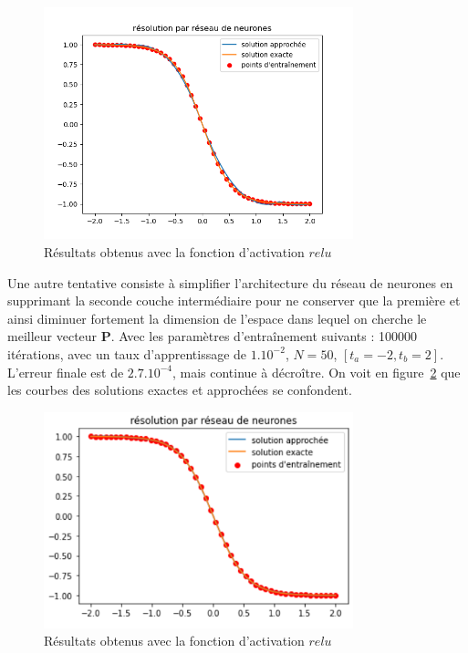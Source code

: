 \documentclass[12pt]{report}
\begin{document}
\begin{figure}
    \centering
    \includegraphics[width=0.8\textwidth]{direct_relu_0_001_10000_32_16_v2.png}
    \caption{Résultats obtenus avec la fonction d'activation $relu$}
    \label{fig:relu_apprentissage_direct}
\end{figure}

Une autre tentative consiste à simplifier l'architecture du réseau de neurones en supprimant la seconde couche intermédiaire pour ne conserver que la première et ainsi diminuer fortement la dimension de l'espace dans lequel on cherche le meilleur vecteur $\bm P$. Avec les paramètres d'entraînement suivants : 100000 itérations, avec un taux d'apprentissage de $1.10^{-2}$, $N=50$, $[t_a = -2, t_b = 2]$.
L'erreur finale est de $2.7.10^{-4}$, mais continue à décroître.
On voit en figure~\ref{fig:Mz_sigmoid_1_couche} que les courbes des solutions exactes et approchées se confondent.

\begin{figure}
    \centering
    \includegraphics[width=0.8\textwidth]{Mz_50000_epochs_1_couche.PNG}
    \caption{Résultats obtenus avec la fonction d'activation $relu$}
    \label{fig:Mz_sigmoid_1_couche}
\end{figure}
\end{document}
